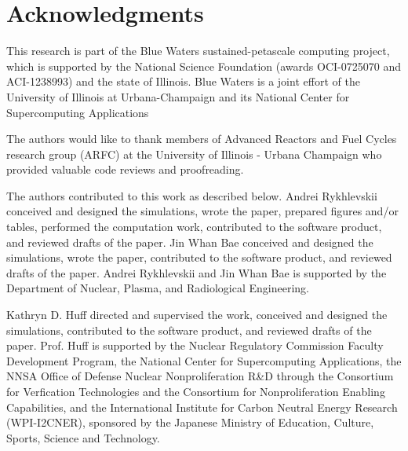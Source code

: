 \section{Acknowledgments}

This research is part of the Blue Waters sustained-petascale computing project, 
which is supported by the National Science Foundation (awards OCI-0725070 and 
ACI-1238993) and the state of Illinois. Blue Waters is a joint effort of the 
University of Illinois at Urbana-Champaign and its National Center for 
Supercomputing Applications 

The authors would like to thank  members of Advanced Reactors and Fuel Cycles
research group (ARFC) at the University of Illinois - Urbana Champaign who 
provided valuable code reviews and proofreading.

The authors contributed to this work as described below.  Andrei Rykhlevskii 
conceived and designed the simulations, wrote the paper, prepared figures 
and/or tables, performed the computation work, contributed to the software 
product, and reviewed drafts of the paper. Jin Whan Bae conceived and designed 
the simulations, wrote the paper, contributed to the software 
product, and reviewed drafts of the paper. Andrei Rykhlevskii and Jin Whan Bae 
is supported by the Department of Nuclear, Plasma, and Radiological Engineering.

Kathryn D. Huff directed and 
supervised the work, conceived and designed the simulations, 
contributed to the software product, and reviewed drafts of the paper.  Prof. 
Huff is supported by the Nuclear Regulatory Commission Faculty Development 
Program, the National Center for Supercomputing Applications, the NNSA Office 
of Defense Nuclear Nonproliferation R\&D through the Consortium for Verfication 
Technologies and the Consortium for Nonproliferation Enabling Capabilities, and 
the International Institute for Carbon Neutral Energy Research (WPI-I2CNER), 
sponsored by the Japanese Ministry of Education, Culture, Sports, Science and 
Technology.
